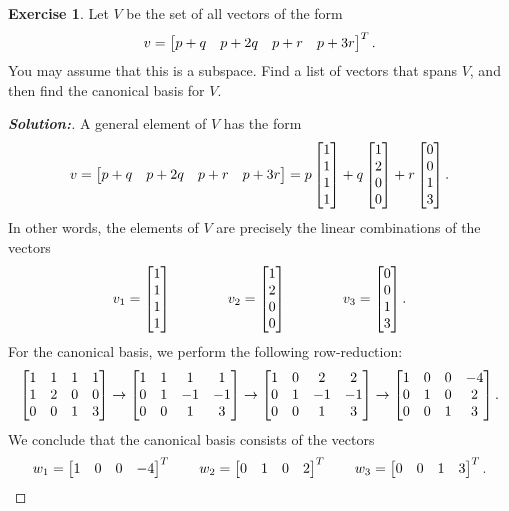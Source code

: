 \documentclass[a4paper]{amsart}
\theoremstyle{definition}
\newtheorem{exercise}{Exercise}
\newenvironment{solution}{\begin{proof}[\textbf{Solution:}] \vphantom{u}}{\end{proof}}
\begin{document}
\begin{exercise}\label{ex-span-canonical-i}
 Let $V$ be the set of all vectors of the form 
 \[ v = \left[\begin{matrix} p+q & p+2q & p+r & p+3r \end{matrix}\right]^T. \]
 You may assume that this is a subspace.  Find a list of vectors that
 spans $V$, and then find the canonical basis for $V$.
\end{exercise}
\begin{solution}
 A general element of $V$ has the form
 \[ v = 
     \left[\begin{matrix} p+q & p+2q & p+r & p+3r \end{matrix}\right] = 
     p \left[\begin{matrix} 1\\1\\1\\1\end{matrix}\right] + 
     q \left[\begin{matrix} 1\\2\\0\\0\end{matrix}\right] +
     r \left[\begin{matrix} 0\\0\\1\\3\end{matrix}\right].
 \]
 In other words, the elements of $V$ are precisely the linear
 combinations of the vectors
 \[ v_1 = \left[\begin{matrix} 1 \\ 1 \\ 1 \\ 1 \end{matrix}\right] \hspace{4em} 
    v_2 = \left[\begin{matrix} 1 \\ 2 \\ 0 \\ 0 \end{matrix}\right] \hspace{4em} 
    v_3 = \left[\begin{matrix} 0 \\ 0 \\ 1 \\ 3 \end{matrix}\right].
 \]
 For the canonical basis, we perform the following row-reduction:
 \[ 
  \left[\begin{matrix} 
   1 & 1 & 1 & 1 \\
   1 & 2 & 0 & 0 \\
   0 & 0 & 1 & 3
  \end{matrix}\right]
  \to 
  \left[\begin{matrix} 
   1 & 1 & 1 & 1 \\
   0 & 1 &-1 &-1 \\
   0 & 0 & 1 & 3
  \end{matrix}\right]
  \to 
  \left[\begin{matrix} 
   1 & 0 & 2 & 2 \\
   0 & 1 &-1 &-1 \\
   0 & 0 & 1 & 3
  \end{matrix}\right]
  \to 
  \left[\begin{matrix} 
   1 & 0 & 0 &-4 \\
   0 & 1 & 0 & 2 \\
   0 & 0 & 1 & 3
  \end{matrix}\right].
 \]
 We conclude that the canonical basis consists of the vectors
 \[ 
   w_1 = \left[\begin{matrix} 1 & 0 & 0 & -4 \end{matrix}\right]^T \hspace{2em}
   w_2 = \left[\begin{matrix} 0 & 1 & 0 &  2 \end{matrix}\right]^T \hspace{2em}
   w_3 = \left[\begin{matrix} 0 & 0 & 1 &  3 \end{matrix}\right]^T.
 \]
\end{solution}
\end{document}

